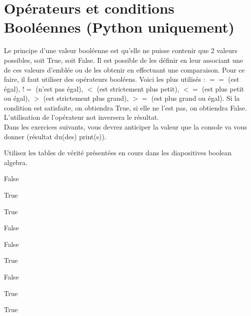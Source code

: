 \newpage
\section{Opérateurs et conditions Booléennes (Python uniquement)}
Le principe d'une valeur booléenne est qu'elle ne puisse contenir que 2 valeurs possibles, soit True, soit False. Il est possible de les définir en leur associant une de ces valeurs d'emblée ou de les obtenir en effectuant une comparaison. Pour ce faire, il faut utiliser des opérateurs booléens. Voici les plus utilisés : $==$ (est égal), $!=$ (n'est pas égal), $<$ (est strictement plus petit), $<=$ (est plus petit ou égal), $>$ (est strictement plus grand), $>=$ (est plus grand ou égal). Si la condition est satisfaite, on obtiendra True, si elle ne l'est pas, on obtiendra False. L'utilisation de l'opérateur not inversera le résultat.\\

Dans les exercices suivants, vous devrez anticiper la valeur que la console va vous donner (résultat du(des) print(s)). \\

\begin{conseil}
	Utilisez les tables de vérité présentées en cours dans les diapositives boolean algebra.
\end{conseil}


\begin{Exercice}[5 minutes] 
    
    

    \begin{solution}
        False 
        
        True 
        
        True 
        
        False 
        
        False \\
    \end{solution}
\end{Exercice}
    
\begin{Exercice}[5 minutes] 
    
    

    \begin{solution}
        True 
        
        False 
        
        True 
        
        True \\
    \end{solution}
    
\end{Exercice}
    
